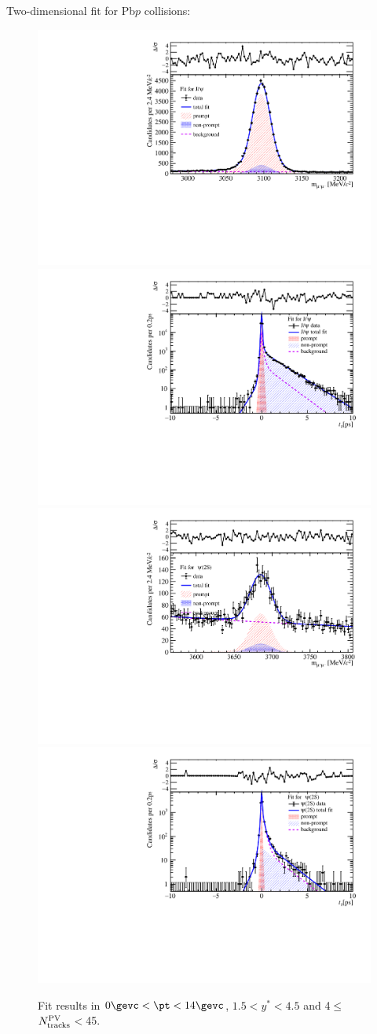 Two-dimensional fit for Pb$p$ collisions:
\begin{figure}[H]
\begin{center}
\includegraphics[width=0.45\linewidth]{pdf/Pbp/Workdir/TwoDimFit/ProjMass/Jpsi_n1y1pt1.pdf}
\includegraphics[width=0.45\linewidth]{pdf/Pbp/Workdir/TwoDimFit/ProjTz/Jpsi_n1y1pt1.pdf}
\vspace*{-0.5cm}
\includegraphics[width=0.45\linewidth]{pdf/Pbp/Workdir/TwoDimFit/ProjMass/Psi2S_n1y1pt1.pdf}
\includegraphics[width=0.45\linewidth]{pdf/Pbp/Workdir/TwoDimFit/ProjTz/Psi2S_n1y1pt1.pdf}
\vspace*{-0.5cm}
\end{center}
\caption{Fit results in $0\gevc<\pt<14\gevc$, $1.5<y^*<4.5$ and 4$\leq$$N_{\rm tracks}^{\rm PV}$$<$45.}
\end{figure}
